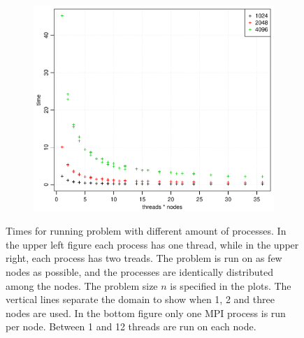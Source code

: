 \begin{figure}[h!]
\begin{subfigure}[b]{0.48\textwidth}
  \end{subfigure}
  \quad
  \begin{subfigure}[b]{0.48\textwidth}
    \includegraphics[width=\textwidth]{./Figures/taskbTimeNodesTimesThreads.pdf}
    \caption{}
    \label{fig:time3}
  \end{subfigure}
  \vspace{-0.1\baselineskip}
  \caption{Times for running problem with different amount of processes. In the upper left figure each process has one thread, while in the upper right, each process has two treads. The problem is run on as few nodes as possible, and the processes are identically distributed among the nodes. The problem size $n$ is specified in the plots. The vertical lines separate the domain to show when 1, 2 and three nodes are used. In the bottom figure only one MPI process is run per node. Between 1 and 12 threads are run on each node.}
  \label{fig:Times}
\end{figure}
\\
